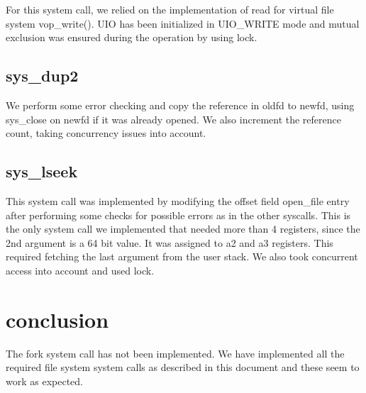 \documentclass[11pt, english]{article}
\begin{document}
For this system call, we relied on the implementation of read for virtual file system vop\_write(). UIO has been initialized in UIO\_WRITE mode and mutual exclusion was ensured during the operation by using lock.

\subsection{sys\_dup2}
 We perform some error checking and copy the reference in oldfd to newfd, using sys\_close on newfd if it was already
opened. We also increment the reference count, taking concurrency issues into account.

\subsection{sys\_lseek}
	This system call was implemented by modifying the offset field open\_file entry after performing some checks for possible errors as in the other syscalls. This is the only system call we implemented that needed more than 4 registers, since the 2nd
argument is a 64 bit value. It was assigned to a2
and a3 registers. This required fetching the last argument from the user stack. We also took concurrent access into account and used lock.

\section{conclusion}
The fork system call has not been implemented. We have implemented all the required file system system calls as described in this document and these seem to work as expected.
\end{document}
